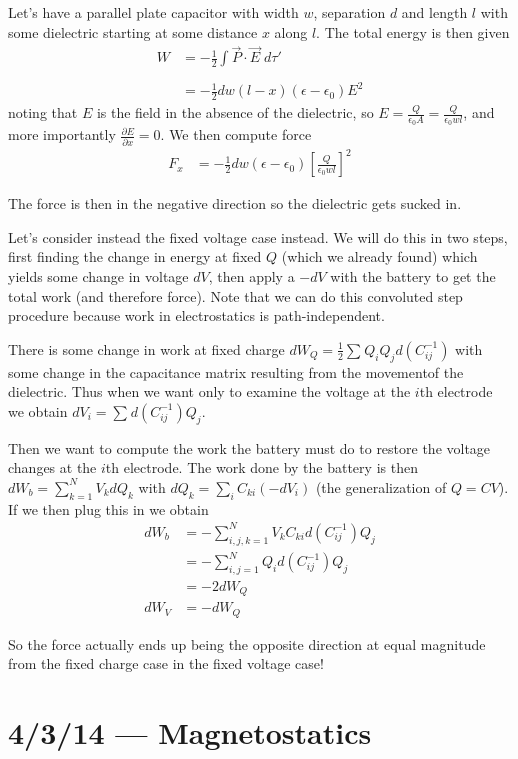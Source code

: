 \documentclass[10pt]{report}
\newcommand{\pd}[2]{\frac{\partial #1}{\partial#2}}
\begin{document}
Let's have a parallel plate capacitor with width $w$, separation $d$ and length $l$ with some dielectric starting at some distance $x$ along $l$. The total energy is then given
\begin{align}
    W &= -\frac{1}{2}\int\limits_{}^{}\vec{P}\cdot \vec{E}\;d\tau'\\
    &= -\frac{1}{2}dw(l-x)(\epsilon - \epsilon_0)E^2
\end{align}
noting that $E$ is the field in the absence of the dielectric, so $E = \frac{Q}{\epsilon_0 A} = \frac{Q}{\epsilon_0 wl}$, and more importantly $\pd{E}{x} = 0$. We then compute force
\begin{align}
    F_x &= -\frac{1}{2}dw(\epsilon - \epsilon_0)\left[ \frac{Q}{\epsilon_0 wl} \right]^2
\end{align}

The force is then in the negative direction so the dielectric gets sucked in.

Let's consider instead the fixed voltage case instead. We will do this in two steps, first finding the change in energy at fixed $Q$ (which we already found) which yields some change in voltage $dV$, then apply a $-dV$ with the battery to get the total work (and therefore force). Note that we can do this convoluted step procedure because work in electrostatics is path-independent.

There is some change in work at fixed charge $dW_Q = \frac{1}{2}\sum_{}^{}Q_iQ_jd(C_{ij}^{-1})$ with some change in the capacitance matrix resulting from the movementof the dielectric. Thus when we want only to examine the voltage at the $i$th electrode we obtain $dV_i = \sum_{}^{}d(C_{ij}^{-1})Q_j$.

Then we want to compute the work the battery must do to restore the voltage changes at the $i$th electrode. The work done by the battery is then $dW_b = \sum_{k=1}^{N}V_kdQ_k$ with $dQ_k = \sum_{i}^{}C_{ki}(-dV_i)$ (the generalization of $Q = CV$). If we then plug this in we obtain
\begin{align}
    dW_b &= -\sum_{i,j,k=1}^{N}V_kC_{ki}d\left( C_{ij}^{-1} \right)Q_j\\
    &= -\sum_{i,j=1}^{N}Q_id\left( C_{ij}^{-1} \right)Q_j\\
    &= -2dW_Q\\
    dW_V &= -dW_Q
\end{align}

So the force actually ends up being the opposite direction at equal magnitude from the fixed charge case in the fixed voltage case!
\chapter{4/3/14 --- Magnetostatics}
\end{document}
